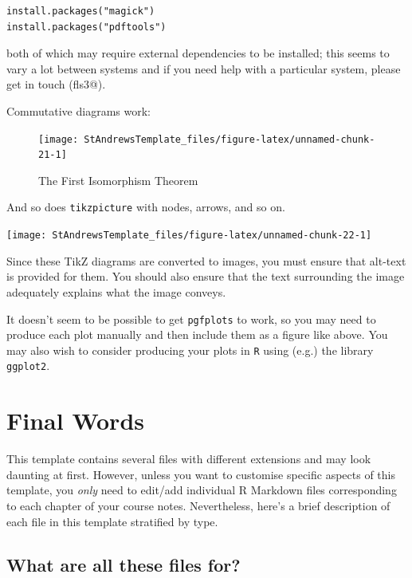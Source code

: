 \documentclass[
  british,
  oneside]{krantz}
\theoremstyle{definition}
\theoremstyle{definition}
\theoremstyle{definition}
\theoremstyle{definition}
\theoremstyle{remark}
\begin{document}
\begin{verbatim}
install.packages("magick")
install.packages("pdftools")
\end{verbatim}

both of which may require external dependencies to be installed; this seems to vary a lot between systems and if you need help with a particular system, please get in touch (fls3@).

Commutative diagrams work:

\begin{figure}

{\centering \texttt{[image: StAndrewsTemplate\_files/figure-latex/unnamed-chunk-21-1]} 

}

\caption{The First Isomorphism Theorem}\label{fig:unnamed-chunk-21}
\end{figure}

And so does \texttt{tikzpicture} with nodes, arrows, and so on.

\begin{center}\texttt{[image: StAndrewsTemplate\_files/figure-latex/unnamed-chunk-22-1]} \end{center}

Since these TikZ diagrams are converted to images, you must ensure that alt-text is provided for them. You should also ensure that the text surrounding the image adequately explains what the image conveys.

It doesn't seem to be possible to get \texttt{pgfplots} to work, so you may need to produce each plot manually and then include them as a figure like above. You may also wish to consider producing your plots in \texttt{R} using (e.g.) the library \texttt{ggplot2}.

\hypertarget{final-words}{%
\chapter{Final Words}\label{final-words}}

This template contains several files with different extensions and may look daunting at first. However, unless you want to customise specific aspects of this template, you \emph{only} need to edit/add individual R Markdown files corresponding to each chapter of your course notes. Nevertheless, here's a brief description of each file in this template stratified by type.

\hypertarget{what-are-all-these-files-for}{%
\section{What are all these files for?}\label{what-are-all-these-files-for}}
\end{document}
